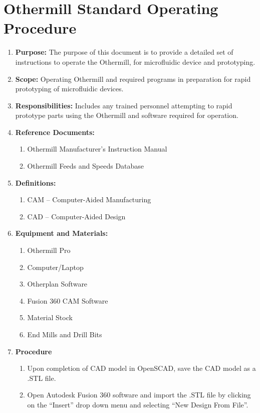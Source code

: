 \chapter{Othermill Standard Operating Procedure}
\label{appendix}
\thispagestyle{myheadings}

\begin{enumerate}
	\item \textbf{Purpose:} The purpose of this document is to provide a detailed set of instructions to operate the Othermill, for microfluidic device and prototyping.
	\item \textbf{Scope:} Operating Othermill and required programs in preparation for rapid prototyping of microfluidic devices.
	\item \textbf{Responsibilities:} Includes any trained personnel attempting to rapid prototype parts using the Othermill and software required for operation.
	\item \textbf{Reference Documents:} 
		\begin{enumerate}
			\item Othermill Manufacturer's Instruction Manual
			\item Othermill Feeds and Speeds Database
		\end{enumerate}
	\item \textbf{Definitions:}
		\begin{enumerate}
			\item CAM -- Computer-Aided Manufacturing
			\item CAD -- Computer-Aided Design
		\end{enumerate}
	\item \textbf{Equipment and Materials:} 
		\begin{enumerate}
			\item Othermill Pro
			\item Computer/Laptop
			\item Otherplan Software
			\item Fusion 360 CAM Software
			\item Material Stock
			\item End Mills and Drill Bits
		\end{enumerate}
	\item \textbf{Procedure}
		\begin{enumerate}
			\item Upon completion of CAD model in OpenSCAD, save the CAD model as a .STL file.
			\item Open Autodesk Fusion 360 software and import the .STL file by clicking on the ``Insert'' drop down menu and selecting ``New Design From File''.

\end{enumerate}
\end{enumerate}
